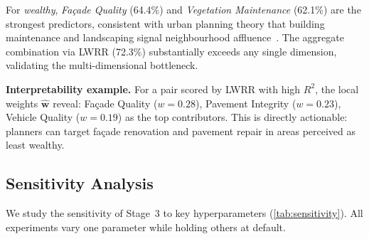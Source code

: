 \documentclass[runningheads]{llncs}
\begin{document}
For \emph{wealthy}, \emph{Fa\c{c}ade Quality} (64.4\%) and \emph{Vegetation Maintenance} (62.1\%) are the strongest predictors, consistent with urban planning theory that building maintenance and landscaping signal neighbourhood affluence~\cite{wilson1982broken}.
The aggregate combination via LWRR (72.3\%) substantially exceeds any single dimension, validating the multi-dimensional bottleneck.

\smallskip\noindent\textbf{Interpretability example.}
For a pair scored by LWRR with high $R^{2}$, the local weights $\hat{\mathbf{w}}$ reveal: Fa\c{c}ade Quality ($w{=}0.28$), Pavement Integrity ($w{=}0.23$), Vehicle Quality ($w{=}0.19$) as the top contributors.
This is directly actionable: planners can target fa\c{c}ade renovation and pavement repair in areas perceived as least wealthy.

\subsection{Sensitivity Analysis}

We study the sensitivity of Stage~3 to key hyperparameters (\cref{tab:sensitivity}).
All experiments vary one parameter while holding others at default.
\end{document}
